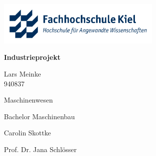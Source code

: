 
\begin{center}
\vspace*{1cm}
\includegraphics[width=0.6\textwidth]{titelseite/fh_kiel_logo_deut_rgb.png}
\\
\begin{Large}
\textbf{Industrieprojekt}
\vspace{1cm}\\

\end{Large}

Lars Meinke\\
940837\\

\vspace*{6cm}

\end{center}
\begin{description}[labelwidth=4cm]
\item[Fachbereich:] Maschinenwesen
\item[Studiengang:] Bachelor Maschinenbau
\end{description}

\begin{description}[labelwidth=4cm]
\item[Erstprüferin:] Carolin Skottke
\item[Zweitprüferin:] Prof. Dr. Jana Schlösser
\end{description}
